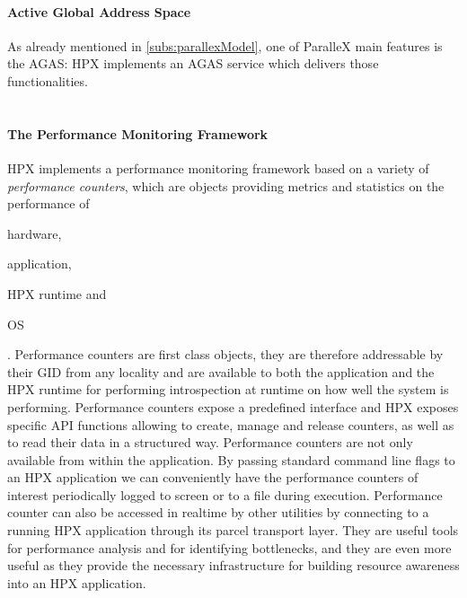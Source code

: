 \paragraph{Active Global Address Space}
As already mentioned in \ref{subs:parallexModel}, one of ParalleX main features is the AGAS: HPX implements an AGAS service which delivers those functionalities.
~\\~

\paragraph{The Performance Monitoring Framework}
HPX implements a performance monitoring framework based on a variety of \emph{performance counters}, which are objects providing metrics and statistics on the performance of
\begin{enumerate*}[label={(\roman*)}]
	\item hardware,
	\item application,
	\item HPX runtime and
	\item OS
\end{enumerate*}.
Performance counters are first class objects, they are therefore addressable by their GID from any locality and are available to both the application and the HPX runtime for performing introspection at runtime on how well the system is performing.\cite{kaiser2014hpx}
Performance counters expose a predefined interface and HPX exposes specific API functions allowing to create, manage and release counters, as well as to read their data in a structured way.
Performance counters are not only available from within the application. By passing standard command line flags to an HPX application we can conveniently have the performance counters of interest periodically logged to screen or to a file during execution. Performance counter can also be accessed in realtime by other utilities by connecting to a running HPX application through its parcel transport layer\cite{kaiser2014hpx}.
They are useful tools for performance analysis and for identifying bottlenecks, and they are even more useful as they provide the necessary infrastructure for building resource awareness into an HPX application\cite{grubel2016using}.

